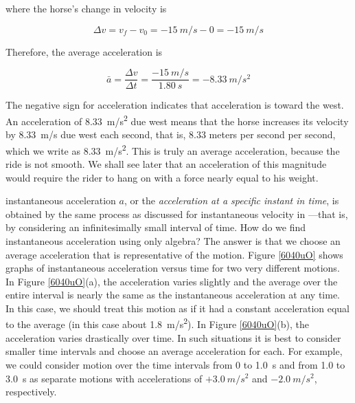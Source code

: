 \documentclass[main-ap-physics.tex]{subfiles}
\begin{document}
where the horse's change in velocity is

\begin{equation*}
    \Delta{v} = v_f - v_0 = -\SI{15}{m/s} - 0 = \SI{-15}{m/s}
\end{equation*}

Therefore, the average acceleration is

\begin{equation*}
    \bar{a} = \frac{\Delta v}{\Delta t} = \frac{-\SI{15}{m/s}}{\SI{1.80}{s}} = -\SI{8.33}{m/s^2}
\end{equation*}

The negative sign for acceleration indicates that acceleration is toward the west. An acceleration of \SI{8.33}{m/s^2} due west means that the horse increases its velocity by \SI{8.33}{m/s} due west each second, that is, 8.33 meters per second per second, which we write as \SI{8.33}{m/s^2}. This is truly an average acceleration, because the ride is not smooth. We shall see later that an acceleration of this magnitude would require the rider to hang on with a force nearly equal to his weight.

\endsolution

\Gls{instantaneous acceleration} $a$, or the \textit{acceleration at a specific instant in time}, is obtained by the same process as discussed for instantaneous velocity in ---that is, by considering an infinitesimally small interval of time. How do we find instantaneous acceleration using only algebra? The answer is that we choose an average acceleration that is representative of the motion. Figure \ref{6040uO} shows graphs of instantaneous acceleration versus time for two very different motions. In Figure \ref{6040uO}(a), the acceleration varies slightly and the average over the entire interval is nearly the same as the instantaneous acceleration at any time. In this case, we should treat this motion as if it had a constant acceleration equal to the average (in this case about \SI{1.8}{m/s^2}). In Figure \ref{6040uO}(b), the acceleration varies drastically over time. In such situations it is best to consider smaller time intervals and choose an average acceleration for each. For example, we could consider motion over the time intervals from 0 to \SI{1.0}{s} and from 1.0 to \SI{3.0}{s} as separate motions with accelerations of $+\SI{3.0}{m/s^2}$ and $-\SI{2.0}{m/s^2}$, respectively.
\end{document}
